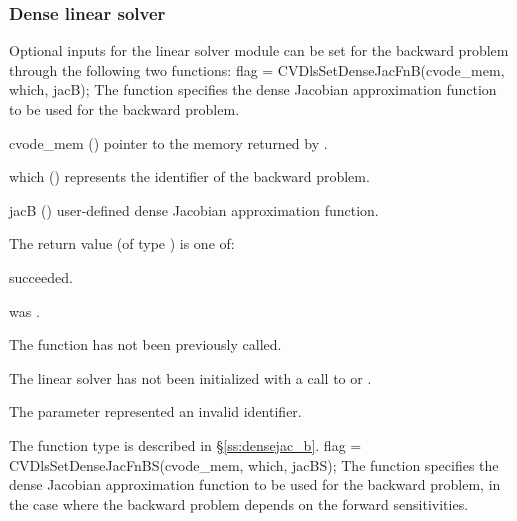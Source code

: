 
\subsubsection{Dense linear solver}
Optional inputs for the {\cvdense} linear solver module can be set for the backward
problem through the following two functions:
{
  flag = CVDlsSetDenseJacFnB(cvode\_mem, which, jacB);
}
{
  The function  specifies the dense Jacobian
  approximation function to be used for the backward problem.
}
{
  \begin{args}
  \item[cvode\_mem] ()
    pointer to the {\cvodes} memory returned by .
  \item[which] ()
    represents the identifier of the backward problem.
  \item[jacB] ()
    user-defined dense Jacobian approximation function.
  \end{args}
}
{
  The return value  (of type ) is one of:
  \begin{args}
  \item[\Id{CVDLS\_SUCCESS}] 
     succeeded.
  \item[\Id{CVDLS\_MEM\_NULL}]
     was .
  \item[\Id{CVDLS\_NO\_ADJ}]
    The function  has not been previously called.
  \item[\Id{CVDLS\_LMEM\_NULL}]
    The linear solver has not been initialized with a call to 
    or .
  \item[\Id{CVDLS\_ILL\_INPUT}]
    The parameter  represented an invalid identifier.
  \end{args}
}
{
  The function type  is described in \S\ref{ss:densejac_b}.
}
{
  flag = CVDlsSetDenseJacFnBS(cvode\_mem, which, jacBS);
}
{
  The function  specifies the dense Jacobian
  approximation function to be used for the backward problem, in the
  case where the backward problem depends on the forward sensitivities.
}
